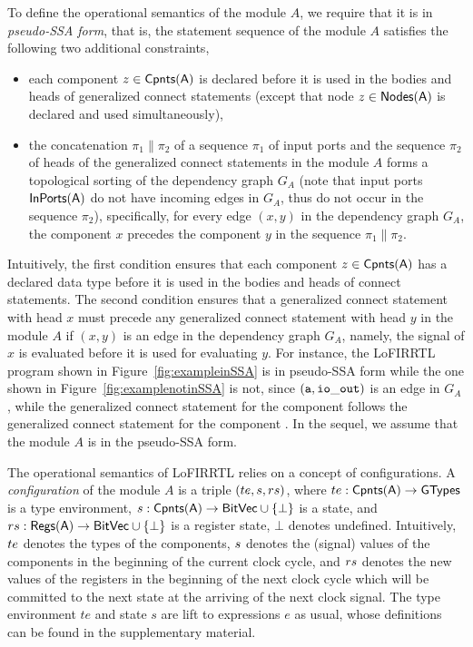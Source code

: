 To define the operational semantics of the module $A$, we require that it is in \emph{pseudo-SSA form}, that is,  the statement sequence of the module $A$ satisfies the following two additional constraints,
\begin{itemize}
\item each component $z\in \sf Cpnts(A)$ is declared before it is used in the bodies and heads of generalized connect statements (except that node $z\in \sf Nodes(A)$ is declared and used simultaneously),
%
\item the concatenation $\pi_1\|\pi_2$ of a sequence  $\pi_1$ of input ports and the sequence $\pi_2$ of heads of the generalized connect statements in the module $A$ forms
 a topological sorting of  the dependency graph $G_A$ (note that input ports $\sf InPorts(A)$ do not have incoming edges in $G_A$, thus
do not occur in the sequence $\pi_2$),
specifically, for every edge $(x, y)$ in the dependency graph $G_A$,
the component $x$ precedes the component $y$ in the sequence $\pi_1\|\pi_2$. %
\end{itemize}

Intuitively,
the first condition ensures that each component $z\in \sf Cpnts(A)$ has a declared data type
before it is used in the bodies and heads of connect statements.
The second condition ensures that a generalized connect statement with head $x$
must precede any generalized connect statement with head $y$ in the module $A$ if $(x, y)$ is an edge in the dependency graph $G_A$,
namely, the signal of $x$ is evaluated before it is used for evaluating $y$.
For instance, the LoFIRRTL program shown in Figure~\ref{fig:exampleinSSA} is in
pseudo-SSA form while the one shown in Figure~\ref{fig:examplenotinSSA} is not, since
$({\tt a}, {\tt io\_out})$ is an edge in $G_A$, while
the generalized connect statement   for the component  follows
the generalized connect statement  for the component .
In the sequel, we assume that the module $A$ is in the pseudo-SSA form.




The operational semantics of LoFIRRTL relies on a concept of configurations.
A \emph{configuration} of the module $A$ is a triple $({te}, {s}, {rs})$, where ${te}:\sf Cpnts(A)\rightarrow \sf GTypes$ is a type environment,
${s}: \sf Cpnts(A)\rightarrow \sf BitVec \cup \{\bot\}$ is a state, and ${rs}: \sf Regs(A)\rightarrow \sf BitVec \cup \{\bot\}$ is a register state,
$\bot$ denotes undefined.
Intuitively, ${te}$ denotes the types of the components, ${s}$ denotes the (signal) values of the components in the beginning of the current clock cycle, and ${rs}$ denotes the new values of the registers in the beginning of the next clock cycle which will be committed to the next state at the arriving of the next clock signal.
The type environment $te$ and state $s$ are lift to expressions $e$ as usual, whose definitions can be found in the supplementary material. %

